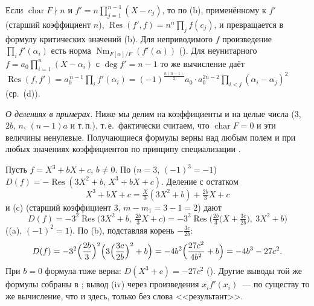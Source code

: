Если $\operatorname{char}F\nmid n$ и $f'=n\prod_{j=1}^{n-1}(X-c_j)$, то по (b), применённому к $f'$ (старший
коэффициент $n$), $\operatorname{Res}(f',f)=n^n\prod_jf(c_j)$, и  превращается в формулу критических значений
(b). Для неприводимого $f$ произведение $\prod_if'(\alpha_i)$ есть норма $\operatorname{Nm}_{F[\alpha]/F}(f'(\alpha))$ (). Для
неунитарного $f=a_0\prod_{i=1}^n(X-\alpha_i)$ с $\deg f'=n-1$ то же вычисление даёт
$\operatorname{Res}(f,f')=a_0^{\,n-1}\prod_if'(\alpha_i)=(-1)^{\frac{n(n-1)}2}a_0\cdot a_0^{2n-2}\prod_{i<j}(\alpha_i-\alpha_j)^2$
(ср.\ (d)).

\emph{О делениях в примерах.} Ниже мы делим на коэффициенты и на целые числа ($3$, $2b$, $n$, $(n-1)a$ и т.\,п.), т.\,е.\
фактически считаем, что $\operatorname{char}F=0$ и эти величины ненулевые. Получающиеся формулы верны над любым полем и
при любых значениях коэффициентов по принципу специализации \rf{4.2c}.

\begin{example}[4.37]
Пусть $f=X^3+bX+c$, $b\ne0$. По  ($n=3$, $(-1)^3=-1$) $D(f)=-\operatorname{Res}(3X^2+b,\,X^3+bX+c)$. Деление с остатком
\[
X^3+bX+c=\tfrac X3(3X^2+b)+\tfrac{2b}3X+c
\]
и (c) (старший коэффициент $3$, $m-m_1=3-1=2$) дают
\[
D(f)=-3^2\operatorname{Res}\bigl(3X^2+b,\ \tfrac{2b}3X+c\bigr)=-3^2\operatorname{Res}\bigl(\tfrac{2b}3\bigl(X+\tfrac{3c}{2b}\bigr),\ 3X^2+b\bigr)
\]
((a), $(-1)^{2}=1$). По (b), подставляя корень $-\frac{3c}{2b}$:
\[
D(f)=-3^2\Bigl(\frac{2b}3\Bigr)^2\Bigl(3\Bigl(\frac{3c}{2b}\Bigr)^2+b\Bigr)=-4b^2\Bigl(\frac{27c^2}{4b^2}+b\Bigr)=-4b^3-27c^2 .
\]
При $b=0$ формула тоже верна: $D(X^3+c)=-27c^2$ (). Другие выводы той же формулы собраны в ; вывод
\rf{4.2e}(iv) через произведения $x_if'(x_i)$~--- по существу то же вычисление, что и здесь, только без слова
<<результант>>.
\end{example}

